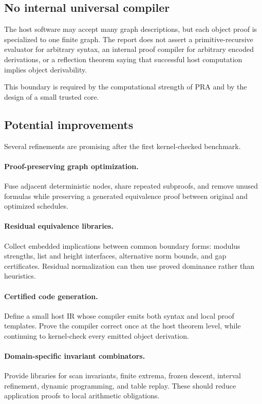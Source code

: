 \subsection{No internal universal compiler}

The host software may accept many graph descriptions, but each object proof is specialized to one finite graph.  The report does not assert a primitive-recursive evaluator for arbitrary  syntax, an internal proof compiler for arbitrary encoded derivations, or a reflection theorem saying that successful host computation implies object derivability.

This boundary is required by the computational strength of PRA and by the design of a small trusted core.

\subsection{Potential improvements}

Several refinements are promising after the first kernel-checked benchmark.

\paragraph{Proof-preserving graph optimization.}
Fuse adjacent deterministic nodes, share repeated subproofs, and remove unused formulas while preserving a generated equivalence proof between original and optimized schedules.

\paragraph{Residual equivalence libraries.}
Collect embedded implications between common boundary forms: modulus strengths, list and height interfaces, alternative norm bounds, and gap certificates.  Residual normalization can then use proved dominance rather than heuristics.

\paragraph{Certified code generation.}
Define a small host IR whose compiler emits both  syntax and local proof templates.  Prove the compiler correct once at the host theorem level, while continuing to kernel-check every emitted object derivation.

\paragraph{Domain-specific invariant combinators.}
Provide libraries for scan invariants, finite extrema, frozen descent, interval refinement, dynamic programming, and table replay.  These should reduce application proofs to local arithmetic obligations.

